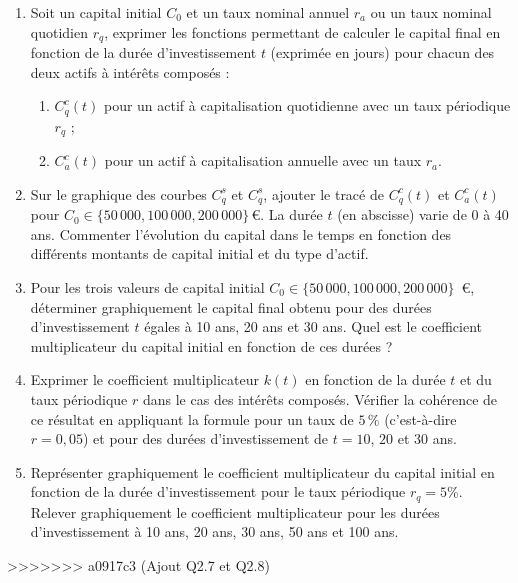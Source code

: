 \documentclass{article}
\begin{document}
\begin{enumerate}[label=\textbf{Q1.\arabic*}]
\begin{enumerate}[label=\textbf{Q2.\arabic*}]
              \item Soit un capital initial \( C_0 \) et un taux nominal annuel \( r_a \) ou un taux nominal quotidien \( r_q \), exprimer les fonctions permettant de calculer le capital final en fonction de la durée d'investissement \( t \) (exprimée en jours) pour chacun des deux actifs à intérêts composés :
                    \begin{enumerate}[label=(\alph*)]
                        \item \( C^c_q(t) \) pour un actif à capitalisation quotidienne avec un taux périodique \( r_q \) ;
                        \item \( C^c_a(t) \) pour un actif à capitalisation annuelle avec un taux \( r_a \).
                    \end{enumerate}
                        
              \item Sur le graphique des courbes $C^s_q$ et $C^s_q$, ajouter le tracé de \( C^c_q(t) \) et \( C^c_a(t) \) pour \( C_0 \in \{50\,000, 100\,000, 200\,000\} \, \text{€} \). La durée \( t \) (en abscisse) varie de 0 à 40 ans. Commenter l'évolution du capital dans le temps en fonction des différents montants de capital initial et du type d'actif.
                        
              \item Pour les trois valeurs de capital initial \( C_0 \in \{50\,000, 100\,000, 200\,000\} \)~€, déterminer graphiquement le capital final obtenu pour des durées d'investissement \( t \) égales à 10 ans, 20 ans et 30 ans. Quel est le coefficient multiplicateur du capital initial en fonction de ces durées ?

              \item Exprimer le coefficient multiplicateur \( k(t) \) en fonction de la durée \( t \) et du taux périodique \( r \) dans le cas des intérêts composés. Vérifier la cohérence de ce résultat en appliquant la formule pour un taux de \( 5\,\% \) (c'est-à-dire \( r=0,05 \)) et pour des durées d'investissement de \( t=10 \), \( 20 \) et \( 30 \) ans.
              
              \item Représenter graphiquement le coefficient multiplicateur du capital initial en fonction de la durée d’investissement pour le taux périodique $r_q = 5\%$. Relever graphiquement le coefficient multiplicateur pour les durées d’investissement à 10 ans, 20 ans, 30 ans, 50 ans et 100 ans.
          \end{enumerate}
          
\end{enumerate}
>>>>>>> a0917c3 (Ajout Q2.7 et Q2.8)
\end{document}
